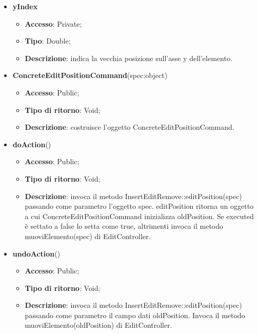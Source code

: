 {{{\begin{itemize}
\begin{itemize}
\begin{itemize}
\begin{itemize}
			\end{itemize}
			\item \textbf{yIndex}
			\begin{itemize}
				\item \textbf{Accesso}: Private;
				\item \textbf{Tipo}: Double;
				\item \textbf{Descrizione}: indica la vecchia posizione sull’asse y dell’elemento.
			\end{itemize}
		\end{itemize}
			\end{itemize}
			\end{itemize}
		\begin{itemize}
			\item \textbf{ConcreteEditPositionCommand}(spec:object)
			\begin{itemize}
				\item \textbf{Accesso}: Public;
				\item \textbf{Tipo di ritorno}: Void;
				\item \textbf{Descrizione}: costruisce l’oggetto ConcreteEditPositionCommand.
			\end{itemize}
			\item \textbf{doAction}()
			\begin{itemize}
				\item \textbf{Accesso}: Public;
				\item \textbf{Tipo di ritorno}: Void;
				\item \textbf{Descrizione}: invoca il metodo InsertEditRemove::editPosition(spec) passando come parametro l'oggetto spec. editPosition ritorna un oggetto a cui ConcreteEditPositionCommand inizializza oldPosition. Se executed è settato a false lo setta come true, altrimenti invoca il metodo muoviElemento(spec) di EditController.
			\end{itemize}
			\item \textbf{undoAction}()
			\begin{itemize}
				\item \textbf{Accesso}: Public;
				\item \textbf{Tipo di ritorno}: Void;
				\item \textbf{Descrizione}: invoca il metodo InsertEditRemove::editPosition(spec) passando come parametro il campo dati oldPosition. Invoca il metodo muoviElemento(oldPosition) di EditController.
			\end{itemize}
		\end{itemize}
		}
	
}}
